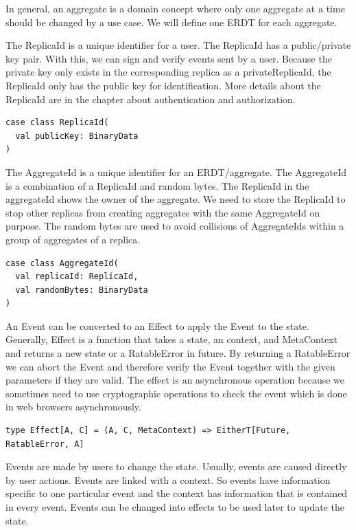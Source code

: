\documentclass[
	ngerman,
	ruledheaders=section,   %
	class=report,		    %
	thesis={type=bachelor}, %
	accentcolor=9c,			%
	custommargins=true,    %
	marginpar=false,        %
	parskip=half-,          %
	fontsize=11pt,          %
]{tudapub}
\begin{document}
In general, an aggregate is a domain concept where only one aggregate at a time should be changed by a use case. We will define one ERDT for each aggregate.

The ReplicaId is a unique identifier for a user. The ReplicaId has a public/private key pair. With this, we can sign and verify events sent by a user. Because the private key only exists in the corresponding replica as a privateReplicaId, the ReplicaId only has the public key for identification. More details about the ReplicaId are in the chapter about authentication and authorization.

\begin{lstlisting}
case class ReplicaId(
  val publicKey: BinaryData
)
\end{lstlisting}

The AggregateId is a unique identifier for an ERDT/aggregate. The AggregateId is a combination of a ReplicaId and random bytes. The ReplicaId in the aggregateId shows the owner of the aggregate. We need to store the ReplicaId to stop other replicas from creating aggregates with the same AggregateId on purpose. The random bytes are used to avoid collisions of AggregateIds within a group of aggregates of a replica.

\begin{lstlisting}
case class AggregateId(
  val replicaId: ReplicaId,
  val randomBytes: BinaryData
)
\end{lstlisting}

An Event can be converted to an Effect to apply the Event to the state. Generally, Effect is a function that takes a state, an context, and MetaContext and returns a new state or a RatableError in future. By returning a RatableError we can abort the Event and therefore verify the Event together with the given parameters if they are valid. The effect is an asynchronous operation because we sometimes need to use cryptographic operations to check the event which is done in web browsers asynchronously.

\begin{lstlisting}
type Effect[A, C] = (A, C, MetaContext) => EitherT[Future, RatableError, A]
\end{lstlisting}

Events are made by users to change the state. Usually, events are caused directly by user actions. Events are linked with a context. So events have information specific to one particular event and the context has information that is contained in every event. Events can be changed into effects to be used later to update the state.
\end{document}
